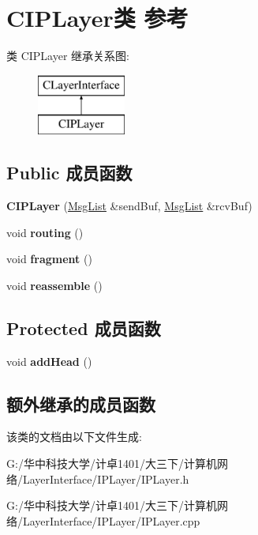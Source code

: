 \hypertarget{class_c_i_p_layer}{}\section{C\+I\+P\+Layer类 参考}
\label{class_c_i_p_layer}
类 C\+I\+P\+Layer 继承关系图\+:\begin{figure}[H]
\begin{center}
\leavevmode
\includegraphics[height=2.000000cm]{class_c_i_p_layer}
\end{center}
\end{figure}
\subsection*{Public 成员函数}
\begin{DoxyCompactItemize}
\item 
\mbox{\label{class_c_i_p_layer_a29f18d33abf037633c2dce2ed727ca5e}} 
{\bfseries C\+I\+P\+Layer} (\hyperlink{class_msg_list}{Msg\+List} \&send\+Buf, \hyperlink{class_msg_list}{Msg\+List} \&rcv\+Buf)
\item 
\mbox{\label{class_c_i_p_layer_afe758e9d359f9318a026ac89672b4b21}} 
void {\bfseries routing} ()
\item 
\mbox{\label{class_c_i_p_layer_a85c7f675704b8605eb16e881abdcca1d}} 
void {\bfseries fragment} ()
\item 
\mbox{\label{class_c_i_p_layer_a68cfe267fa5138e11051d746540ae714}} 
void {\bfseries reassemble} ()
\end{DoxyCompactItemize}
\subsection*{Protected 成员函数}
\begin{DoxyCompactItemize}
\item 
\mbox{\label{class_c_i_p_layer_a4a73e335cc0801fe2a7f0de6ab955411}} 
void {\bfseries add\+Head} ()
\end{DoxyCompactItemize}
\subsection*{额外继承的成员函数}


该类的文档由以下文件生成\+:\begin{DoxyCompactItemize}
\item 
G\+:/华中科技大学/计卓1401/大三下/计算机网络/\+Layer\+Interface/\+I\+P\+Layer/I\+P\+Layer.\+h\item 
G\+:/华中科技大学/计卓1401/大三下/计算机网络/\+Layer\+Interface/\+I\+P\+Layer/I\+P\+Layer.\+cpp\end{DoxyCompactItemize}
